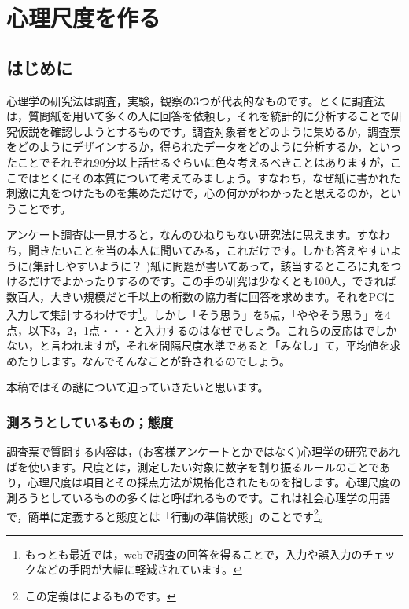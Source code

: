 \documentclass{ltjsbook}
\begin{document}
\chapter{心理尺度を作る}
\label{x02_testTheory}
\section{はじめに}
心理学の研究法は調査，実験，観察の3つが代表的なものです。とくに調査法は，質問紙を用いて多くの人に回答を依頼し，それを統計的に分析することで研究仮説を確認しようとするものです。調査対象者をどのように集めるか，調査票をどのようにデザインするか，得られたデータをどのように分析するか，といったことでそれぞれ90分以上話せるぐらいに色々考えるべきことはありますが，ここではとくにその本質について考えてみましょう。すなわち，なぜ紙に書かれた刺激に丸をつけたものを集めただけで，心の何かがわかったと思えるのか，ということです。

アンケート調査は一見すると，なんのひねりもない研究法に思えます。すなわち，聞きたいことを当の本人に聞いてみる，これだけです。しかも答えやすいように(集計しやすいように？ )紙に問題が書いてあって，該当するところに丸をつけるだけでよかったりするのです。この手の研究は少なくとも100人，できれば数百人，大きい規模だと千以上の桁数の協力者に回答を求めます。それをPCに入力して集計するわけです\footnote{もっとも最近では，webで調査の回答を得ることで，入力や誤入力のチェックなどの手間が大幅に軽減されています。}。しかし「そう思う」を5点，「ややそう思う」を4点，以下3，2，1点・・・と入力するのはなぜでしょう。これらの反応はでしかない，と言われますが，それを間隔尺度水準であると「みなし」て，平均値を求めたりします。なんでそんなことが許されるのでしょう。

本稿ではその謎について迫っていきたいと思います。
\subsection{測ろうとしているもの；態度}
調査票で質問する内容は，(お客様アンケートとかではなく)心理学の研究であればを使います。尺度とは，測定したい対象に数字を割り振るルールのことであり，心理尺度は項目とその採点方法が規格化されたものを指します。心理尺度の測ろうとしているものの多くはと呼ばれるものです。これは社会心理学の用語で，簡単に定義すると態度とは「行動の準備状態」のことです\footnote{この定義は\textcite{Allport1935}によるものです。}。
\end{document}
